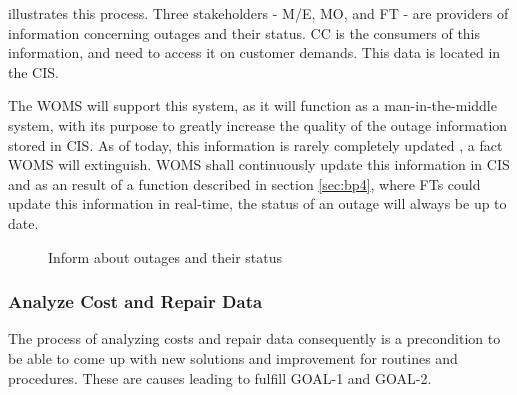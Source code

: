  illustrates this process. Three stakeholders - M/E, MO, and FT - are providers of information concerning outages and their status. CC is the consumers of this information, and need to access it on customer demands. This data is located in the CIS. 

The WOMS will support this system, as it will function as a man-in-the-middle system, with its purpose to greatly increase the quality of the outage information stored in CIS. As of today, this information is rarely completely updated \cite{A}, a fact WOMS will extinguish. WOMS shall continuously update this information in CIS and as an result of a function described in section \ref{sec:bp4}, where FTs could update this information in real-time, the status of an outage will always be up to date. 
\begin{figure}[H]
	\centering
	\setlength\fboxsep{7pt}
	\setlength\fboxrule{0.5pt}
	\caption{Inform about outages and their status}
	\label{fig:inform}
\end{figure}
%
\subsubsection{Analyze Cost and Repair Data}
\label{sec:bp6}
The process of analyzing costs and repair data consequently is a precondition to be able to come up with new solutions and improvement for routines and procedures. These are causes leading to fulfill GOAL-1 and GOAL-2. 

